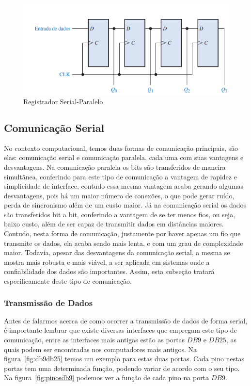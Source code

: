 \documentclass[12pt]{article}
\begin{document}
\begin{figure}[h]
\centering
\includegraphics[width=.5\textwidth]{img/Fig7RegistradorSerialParalelo.png}
\caption{Registrador Serial-Paralelo}
\label{fig:registradorsp}
\end{figure}

\subsection{Comunicação Serial}
No contexto computacional, temos duas formas de comunicação principais, são elas: comunicação serial e comunicação paralela. cada uma com suas vantagens e desvantagens. Na comunicação paralela os bits são transferidos de maneira simultânea, conferindo para este tipo de comunicação a vantagem de rapidez e simplicidade de interface, contudo essa mesma vantagem acaba gerando algumas desvantagens, pois há um maior número de conexões, o que pode gerar ruído, perda de sincronismo além de um custo maior. Já na comunicação serial os dados são transferidos  bit a bit, conferindo a vantagem de se ter menos fios, ou seja, baixo custo, além de ser capaz de transmitir dados em distâncias maiores. Contudo, nesta forma de comunicação, justamente por haver apenas um fio que transmite os dados, ela acaba sendo mais lenta, e com um grau de complexidade maior. Todavia, apesar das desvantagens da comunicação serial, a mesma se mostra mais robusta e mais viável, a ser aplicada em sistemas onde a confiabilidade dos dados são importantes. Assim, esta subseção tratará especificamente deste tipo de comunicação. 

\subsubsection{Transmissão de Dados}
Antes de falarmos acerca de como ocorrer a transmissão de dados de forma serial, é importante lembrar que existe diversas interfaces que empregam este tipo de comunicação, entre as interfaces mais antigas estão as portas $DB9$ e $DB25$, as quais podem ser encontradas nos computadores mais antigos. Na figura~\ref{fig:db9db25} temos um exemplo para estas duas portas. Cada pino nestas portas tem uma determinada função, podendo variar de acordo com o seu tipo. Na  figura~\ref{fig:pinosdb9} podemos ver a função de cada pino na porta $DB9$.
\end{document}
